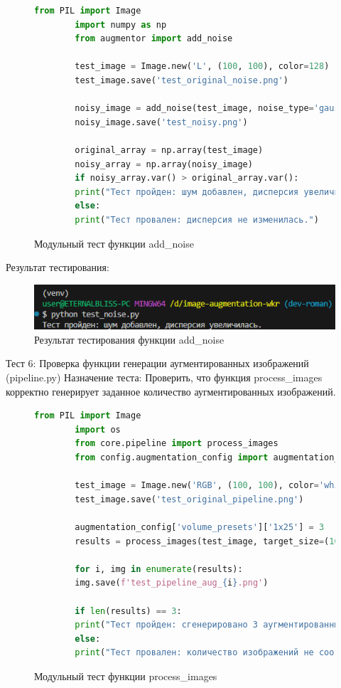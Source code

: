\begin{figure}[H]
	\begin{lstlisting}[language=Python]
		from PIL import Image
		import numpy as np
		from augmentor import add_noise
		
		test_image = Image.new('L', (100, 100), color=128)
		test_image.save('test_original_noise.png')
		
		noisy_image = add_noise(test_image, noise_type='gaussian', stddev=15)
		noisy_image.save('test_noisy.png')
		
		original_array = np.array(test_image)
		noisy_array = np.array(noisy_image)
		if noisy_array.var() > original_array.var():
		print("Тест пройден: шум добавлен, дисперсия увеличилась.")
		else:
		print("Тест провален: дисперсия не изменилась.")
	\end{lstlisting}  
	\caption{Модульный тест функции add\_noise}
	\label{model_test:test5}
\end{figure}

Результат тестирования:
\begin{figure}[H]
	\centering
	\includegraphics[width=0.7\linewidth]{images/resulttest5}
	\caption{Результат тестирования функции add\_noise}
	\label{fig:resulttest5}
\end{figure}

Тест 6: Проверка функции генерации аугментированных изображений (pipeline.py)
Назначение теста: Проверить, что функция process\_images корректно генерирует заданное количество аугментированных изображений.

\begin{figure}[H]
	\begin{lstlisting}[language=Python]
		from PIL import Image
		import os
		from core.pipeline import process_images
		from config.augmentation_config import augmentation_config
		
		test_image = Image.new('RGB', (100, 100), color='white')
		test_image.save('test_original_pipeline.png')
		
		augmentation_config['volume_presets']['1х25'] = 3
		results = process_images(test_image, target_size=(100, 100), volume_level='1х25')
		
		for i, img in enumerate(results):
		img.save(f'test_pipeline_aug_{i}.png')
		
		if len(results) == 3:
		print("Тест пройден: сгенерировано 3 аугментированных изображения.")
		else:
		print("Тест провален: количество изображений не соответствует ожидаемому.")
	\end{lstlisting}  
	\caption{Модульный тест функции process\_images}
	\label{model_test:test6}
\end{figure}

